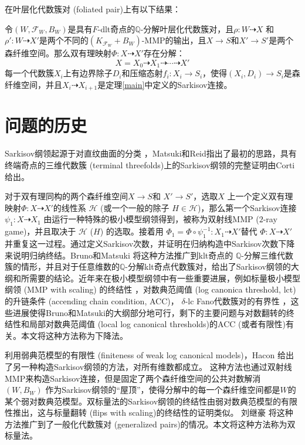 在叶层化代数簇对 (foliated pair)上有以下结果：
\begin{theorem}[弱Sarkisov分解]\label{mainf}
  令$(W,\mathcal{F}_{W},B_{W})$是具有$F$-dlt奇点的$\mathbb{Q}$-分解叶层化代数簇对，且$\rho:W\dashrightarrow X$ 和$\rho':W \dashrightarrow X'$是两个不同的$(K_{\mathcal{F}_{W}}+B_{W})$-MMP的输出，且$X \to S$和$X' \to S'$是两个森纤维空间。那么双有理映射$\Phi:X \dashrightarrow X'$存在分解：
  \[ X=X_{0}\dashrightarrow X_{1}\dashrightarrow \cdots \dashrightarrow X' \]
  每一个代数簇$X_{i}$上有边界除子$D_{i}$和压缩态射$f_{i}:X_{i}\to S_{i}$，使得$(X_{i},D_{i})\to S_{i}$是森纤维空间，并且$X_{i} \dashrightarrow X_{i+1}$是定理\ref{main}中定义的Sarkisov连接。
\end{theorem}

\section{问题的历史}
Sarkisov纲领起源于对直纹曲面的分类 \cite{sarkisovBIRATIONALAUTOMORPHISMSCONIC1981,sarkisovCONICBUNDLESTRUCTURES1983}，Matsuki和Reid指出了最初的思路，具有终端奇点的三维代数簇 (terminal threefolds)上的Sarkisov纲领的完整证明由Corti\cite{cortiFactoringBirationalMaps}给出。 

对于双有理同构的两个森纤维空间$X\to S$和 $X'\to S'$，选取$X$ 上一个定义双有理映射$\Phi:X \dashrightarrow X'$的线性系 $\mathcal{H}$ (或一个一般的除子 $H \in \mathcal{H}$)，那么第一个Sarkisov连接 $\psi_1:X\dashrightarrow X_1$ 由运行一种特殊的极小模型纲领得到，被称为双射线MMP ($2$-ray game)，并且取决于 $\mathcal{H}$ ($H$) 的选取。接着用 $\Phi_{1}=\Phi\circ \psi_1^{-1}: X_1 \dashrightarrow X'$替代 $\Phi:X\dashrightarrow X'$并重复这一过程。通过定义Sarkisov次数，并证明在归纳构造中Sarkisov次数下降来说明归纳终结。Bruno和Matsuki \cite{brunoLogSarkisovProgram1995} 将这种方法推广到klt奇点的 $\mathbb{Q}$-分解三维代数簇的情形，并且对于任意维数的$\mathbb{Q}$-分解klt奇点代数簇对，给出了Sarkisov纲领的大纲和所需要的结论。近年来在极小模型纲领中有一些重要进展，例如标量极小模型纲领 (MMP with scaling) 的终结性 \cite{BCHM10}，对数典范阈值 (log canonica threshold, lct)的升链条件 (accending chain condition, ACC)\cite{HMX14}， $\delta$-lc Fano代数簇对的有界性 \cite{Bir19,birkarSingularitiesLinearSystems2020}，这些进展使得Bruno和Matsuki的大纲部分地可行，剩下的主要问题与对数翻转的终结性和局部对数典范阈值 (local log canonical thresholds)的ACC (或者有限性)有关。本文将这种方法称为下降法。


利用弱典范模型的有限性\cite{BCHM10} (finiteness of weak log canonical models)，Hacon \cite{haconMinimalModelProgram2012} 给出了另一种构造Sarkisov纲领的方法，对所有维数都成立。
这种方法也通过双射线MMP来构造Sarkisov连接，但是固定了两个森纤维空间的公共对数解消 $(W,B_W)$ 作为Sarkisov纲领的``屋顶''，使得分解中的每一个森纤维空间都是$W$的某个弱对数典范模型。双标量法的Sarkisov纲领的终结性由弱对数典范模型的有限性推出，这与标量翻转 (flips with scaling)的终结性的证明类似。
刘继豪 \cite{liuSarkisovProgramGeneralized2021} 将这种方法推广到了一般化代数簇对 (generalized pairs)的情况。本文将这种方法称为双标量法。


